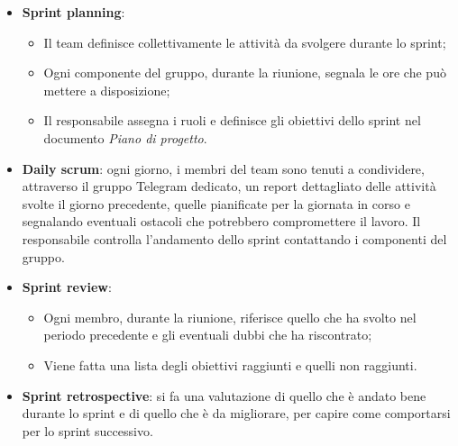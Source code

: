 \begin{itemize}
    \item \textbf{Sprint planning}:
          \begin{itemize}
              \item Il team definisce collettivamente le attività da svolgere durante lo sprint;
              \item Ogni componente del gruppo, durante la riunione, segnala le ore che può mettere
                    a disposizione;
              \item Il responsabile assegna i ruoli e definisce gli obiettivi dello sprint nel
                    documento \textit{Piano di progetto}.
          \end{itemize}
    \item \textbf{Daily scrum}: ogni giorno, i membri del team sono tenuti a condividere, attraverso il gruppo Telegram dedicato,
          un report dettagliato delle attività svolte il giorno precedente,
          quelle pianificate per la giornata in corso e segnalando eventuali ostacoli che potrebbero compromettere il lavoro.
          Il responsabile controlla l'andamento dello sprint contattando i componenti del gruppo.
    \item \textbf{Sprint review}:
          \begin{itemize}
              \item Ogni membro, durante la riunione, riferisce quello che ha svolto nel periodo
                    precedente e gli eventuali dubbi che ha riscontrato;
              \item Viene fatta una lista degli obiettivi raggiunti e quelli non raggiunti.
          \end{itemize}
    \item \textbf{Sprint retrospective}: si fa una valutazione di quello che è andato bene durante lo sprint e di
          quello che è da migliorare, per capire come comportarsi per lo sprint successivo.
\end{itemize}

